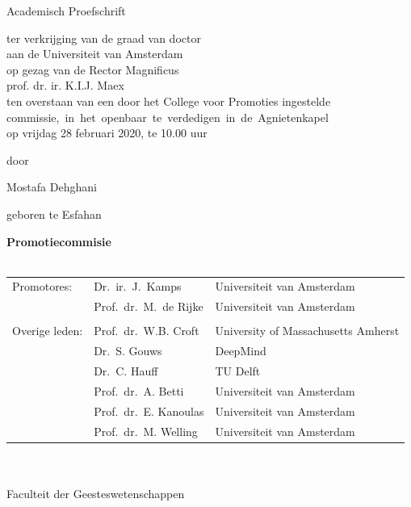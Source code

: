 {%
\clearpage
\par\vskip 2cm
\begin{center}
\printtitle
\par\vspace {6cm}
{\large \sc Academisch Proefschrift}
\par\vspace {1cm}
{\fontsize{14}{17}\selectfont ter verkrijging van de graad van doctor\\
aan de Universiteit van Amsterdam\\
op gezag van de Rector Magnificus\\
prof. dr. ir. K.I.J. Maex\\                                 %
ten overstaan van een door het College voor Promoties ingestelde\\
\mbox{commissie, in het openbaar te verdedigen in de Agnietenkapel}\\        %
op vrijdag 28 februari 2020, te 10.00 uur \\ }        %
\par\vspace {1cm} {\large door}
\par \vspace {1cm} %
{\Large Mostafa Dehghani}                        %
\par\vspace {1cm} %
{\large geboren te Esfahan} %
\end{center}

\clearpage
\noindent%
{\bf Promotiecommisie}\\
\\
\begin{tabular}[t]{@{}lll}
Promotores:      
& Dr.\ ir.\ J.~Kamps  & Universiteit van Amsterdam \\  
& Prof.\ dr.\ M.~de Rijke  & Universiteit van Amsterdam \\  

\\
Overige leden: 
& Prof.\ dr.\ W.B. Croft   &  University of Massachusetts Amherst \\ 
& Dr.\ S. Gouws  &  DeepMind \\ 
& Dr.\ C. Hauff   &   TU Delft \\ 
& Prof.\ dr.\ A. Betti    &  Universiteit van Amsterdam \\ 
& Prof.\ dr.\ E. Kanoulas    &  Universiteit van Amsterdam \\ 
& Prof.\ dr.\ M. Welling    &  Universiteit van Amsterdam \\ 
\end{tabular}\\
\\
Faculteit der Geesteswetenschappen \\ %
} %
